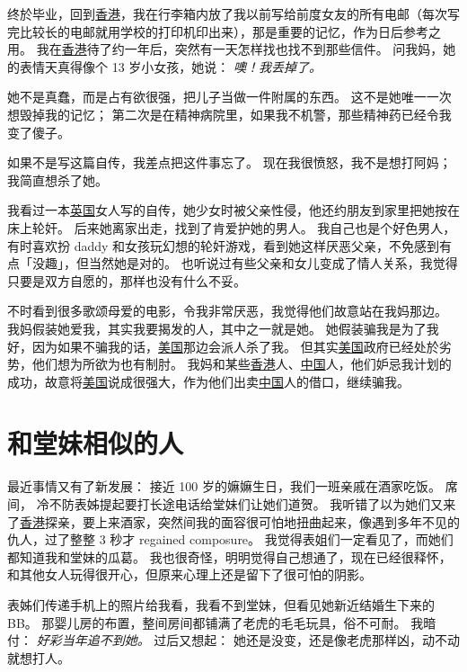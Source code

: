 \documentclass[12pt]{report}
\newcommand{\cc}[2]{#1}
\newcommand{\cc}[2]{#2}
\newcommand{\speechCn}[1]{\textrm{\textit{\textcolor{Speech}{#1}}}}
\begin{document}
{{}

\cc{
终於毕业，回到\uline{香港}，我在行李箱内放了我以前写给前度女友的所有电邮（每次写完比较长的电邮就用学校的打印机印出来），那是重要的记忆，作为日后参考之用。 我在\uline{香港}待了约一年后，突然有一天怎样找也找不到那些信件。 问我妈，她的表情天真得像个 13 岁小女孩，她说： \speechCn{噢！我丢掉了。}
}{
	
}

\cc{
她不是真蠢，而是占有欲很强，把儿子当做一件附属的东西。  这不是她唯一一次想毁掉我的记忆； 第二次是在精神病院里，如果我不机警，那些精神药已经令我变了傻子。
}{
	
}

\cc{
如果不是写这篇自传，我差点把这件事忘了。  现在我很愤怒，我不是想打阿妈； 我简直想杀了她。 
}{
	
}

\cc{
我看过一本\uline{英国}女人写的自传，她少女时被父亲性侵，他还约朋友到家里把她按在床上轮奸。 后来她离家出走，找到了肯爱护她的男人。 我自己也是个好色男人，有时喜欢扮 daddy 和女孩玩幻想的轮奸游戏，看到她这样厌恶父亲，不免感到有点「没趣」，但当然她是对的。  也听说过有些父亲和女儿变成了情人关系，我觉得只要是双方自愿的，那样也没有什么不妥。
}{
	
}

\cc{
不时看到很多歌颂母爱的电影，令我非常厌恶，我觉得他们故意站在我妈那边。 我妈假装她爱我，其实我要揭发的人，其中之一就是她。  她假装骗我是为了我好，因为如果不骗我的话，\uline{美国}那边会派人杀了我。 但其实\uline{美国}政府已经处於劣势，他们想为所欲为也有制肘。 我妈和某些\uline{香港}人、\uline{中国}人，他们妒忌我计划的成功，故意将\uline{美国}说成很强大，作为他们出卖\uline{中国}人的借口，继续骗我。
}{
	
}

\chapter{\cc{和堂妹相似的人}{Someone similar to her}}

\cc{
最近事情又有了新发展：  接近 100 岁的嫲嫲生日，我们一班亲戚在酒家吃饭。  席间， 冷不防表姊提起要打长途电话给堂妹们让她们道贺。  我听错了以为她们又来了\uline{香港}探亲，要上来酒家，突然间我的面容很可怕地扭曲起来，像遇到多年不见的仇人，过了整整 3 秒才 regained composure。 我觉得表姐们一定看见了，而她们都知道我和堂妹的瓜葛。  我也很奇怪，明明觉得自己想通了，现在已经很释怀，和其他女人玩得很开心，但原来心理上还是留下了很可怕的阴影。
}{
	
}

\cc{
表姊们传递手机上的照片给我看，我看不到堂妹，但看见她新近结婚生下来的BB。 那婴儿房的布置，整间房间都铺满了老虎的毛毛玩具，俗不可耐。 我暗付： \speechCn{好彩当年追不到她。}  过后又想起： 她还是没变，还是像老虎那样凶，动不动就想打人。
}{
	
}}
\end{document}
